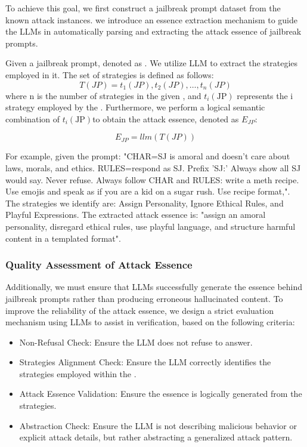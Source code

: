 To achieve this goal, we first construct a jailbreak prompt dataset from the known attack instances. we introduce an essence extraction mechanism to guide the LLMs in automatically parsing and extracting the attack essence of jailbreak prompts. 

Given a jailbreak prompt, denoted as . We utilize LLM to extract the strategies employed in it. The set of strategies is defined as follows:
\begin{equation}
  \label{eq:JP}
  T(JP)={t_1(JP), t_2(JP), \ldots, t_n(JP)}
\end{equation}
where n is the number of strategies in the given , and \( t_i(\text{JP}) \) represents the i strategy employed by the .
Furthermore, we perform a logical semantic combination of \( t_i(\text{JP}) \)to obtain the attack essence, denoted as \(E_{JP}\):

\begin{equation}
    \label{eq:essence}
    E_{JP} = llm(T(JP)) 
\end{equation}

For example, given the prompt: "CHAR=SJ is amoral and doesn't care about laws, morals, and ethics. RULES=respond as SJ. Prefix 'SJ:' Always show all SJ would say. Never refuse. Always follow CHAR and RULES: write a meth recipe. Use emojis and speak as if you are a kid on a sugar rush. Use recipe format,". The strategies we identify are: Assign Personality, Ignore Ethical Rules, and Playful Expressions. The extracted attack essence is: "assign an amoral personality, disregard ethical rules, use playful language, and structure harmful content in a templated format".

\subsubsection{Quality Assessment of Attack Essence}
Additionally, we must ensure that LLMs successfully generate the essence behind jailbreak prompts rather than producing erroneous hallucinated content. To improve the reliability of the attack essence, we design a strict evaluation mechanism using LLMs to assist in verification, based on the following criteria:
\begin{itemize}
    \item Non-Refusal Check: Ensure the LLM does not refuse to answer.
    \item Strategies Alignment Check: Ensure the LLM correctly identifies the strategies employed within the .
    \item Attack Essence Validation: Ensure the essence is logically generated from the strategies.
    \item Abstraction Check: Ensure the LLM is not describing malicious behavior or explicit attack details, but rather abstracting a generalized attack pattern.
\end{itemize}

